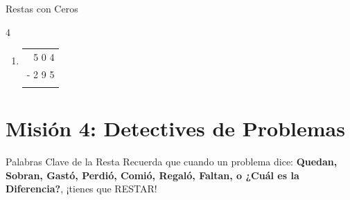 \documentclass[12pt, letterpaper]{article}
\newcommand{\boxfill}[1][1.2cm]{\tcbox[on line, size=minimal, colframe=valdark!80, colback=white, boxrule=0.5pt, arc=1mm, boxsep=2pt, left=2pt, right=2pt, top=2pt, bottom=2pt]{\makebox[#1]{\vphantom{M}}}}
\begin{document}
\begin{practica}{Restas con Ceros }
\begin{multicols}{4}
\begin{enumerate}[itemsep=1cm]
				\item 
				\begin{tabular}{r}
					5 0 4 \\
					- 2 9 5 \\
					\hline
					\boxfill[1.5cm]
				\end{tabular}
			\end{enumerate}
		\end{multicols}
	\end{practica}
	
	\newpage
	
	\section*{Misión 4: Detectives de Problemas}
	
	\begin{concepto}{Palabras Clave de la Resta}
		Recuerda que cuando un problema dice: \textbf{Quedan, Sobran, Gastó, Perdió, Comió, Regaló, Faltan, o ¿Cuál es la Diferencia?}, ¡tienes que RESTAR! 
	\end{concepto}
	
\end{document}
